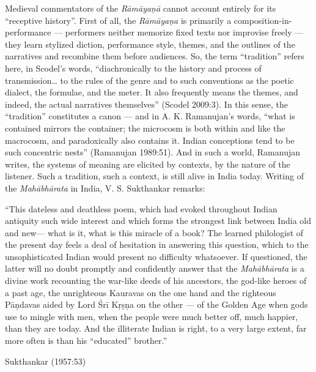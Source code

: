 Medieval commentators of the {\sl Rāmāyaṇā} cannot account entirely for its “receptive history”. First of all, the {\sl Rāmāyaṇa} is primarily a composition-in-performance --- performers neither memorize fixed texts nor improvise freely --- they learn stylized diction, performance style, themes, and the outlines of the narratives and recombine them before audiences.  So, the term “tradition” refers here, in Scodel’s words, “diachronically to the history and process of transmission… to the rules of the genre and to such conventions as the poetic dialect, the formulae, and the meter. It also frequently means the themes, and indeed, the actual narratives themselves” (Scodel 2009:3). In this sense, the “tradition” constitutes a canon --- and in A. K. Ramanujan’s words, “what is contained mirrors the container; the microcosm is both within and like the macrocosm, and paradoxically also contains it. Indian conceptions tend to be such concentric nests” (Ramanujan 1989:51). And in such a world, Ramanujan writes, the systems of meaning are elicited by contexts, by the nature of the listener. Such a tradition, such a context, is still alive in India today. Writing of the {\sl Mahābhārata} in India, V. S. Sukthankar remarks:

\begin{myquote}
“This dateless and deathless poem, which had evoked throughout Indian antiquity such wide interest and which forms the strongest link between India old and new--- what is it, what is this miracle of a book? The learned philologist of the present day feels a deal of hesitation in answering this question, which to the unsophisticated Indian would present no difficulty whatsoever. If questioned, the latter will no doubt promptly and confidently answer that the {\sl Mahābhārata} is a divine work recounting the war-like deeds of his ancestors, the god-like heroes of a past age, the unrighteous Kauravas on the one hand and the righteous Pāṇdavas aided by Lord Śrī Kṛṣṇa on the other --- of the Golden Age when gods use to mingle with men, when the people were much better off, much happier, than they are today. And the illiterate Indian is right, to a very large extent, far more often is than his “educated” brother.” 

\hfill	Sukthankar (1957:53)
\end{myquote}

